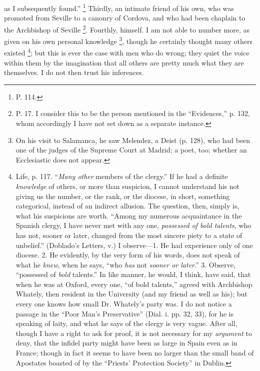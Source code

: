 as I subsequently found.'' \footnote{P. 114.} Thirdly, an
intimate friend of his own, who was promoted from Seville
to a canonry of Cordova, and who had been chaplain to the
Archbishop of Seville \footnote{P. 17. I consider this to be
the person mentioned in the ``Evidences,'' p.
132, whom accordingly I have not set down as a separate
instance.}. Fourthly, himself. I am not
able to number more, as given on his own personal knowledge \footnote{On his visit to Salamanca, he
saw Melendez, a Deist (p. 128), who had been one of the
judges of the Supreme Court at Madrid; a poet, too;
whether an Ecclesiastic does not appear.},
though he certainly thought many others existed \footnote{Life, p. 117. ``\emph{Many
other} members of the clergy.'' If he had a
definite \emph{knowledge} of others, or more than
suspicion, I cannot understand his not giving us the
number, or the rank, or the diocese, in short, something
categorical, instead of an indirect allusion. The
question, then, simply is, what his suspicions are worth.
``Among my numerous acquaintance in the Spanish
clergy, I have never met with any one, \emph{possessed of
bold talents}, who has not, sooner or later, changed
from the most sincere piety to a state of unbelief.''
(Doblado's Letters, v.) I observe—1. He had
experience only of one diocese. 2. He evidently, by the
very form of his words, does not speak of what he \emph{knew},
when he says, ``who \emph{has} not \emph{sooner or
later}.'' 3. Observe, ``possessed of \emph{bold}
talents.'' In like manner, he would, I think, have
said, that when he was at Oxford, every one, ``of
bold talents,'' agreed with Archbishop Whately, then
resident in the University (and my friend as well as
his); but every one knows how small Dr. Whately's party
was. I do not notice a passage in the ``Poor Man's
Preservative'' (Dial. i. pp. 32, 33), for he is
speaking of laity, and what he says of the clergy is very
vague. After all, though I have a right to ask for proof,
it is not necessary for my \emph{argument} to deny,
that the infidel party might have been as large in Spain
even as in France; though in fact it seems to have been
no larger than the small band of Apostates boasted of by
the ``Priests' Protection Society'' in Dublin.}; but this
is ever the case with men who do wrong; they
quiet the voice within them by the imagination that all
others are pretty much what they are themselves. I do not
then trust his inferences.

